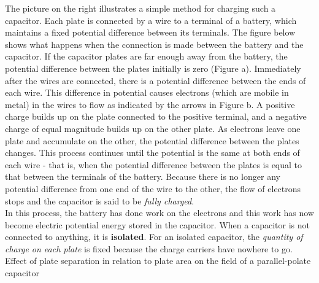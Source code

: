        The picture on the right illustrates a simple method for charging such a capacitor. Each plate is connected by a wire to a terminal of a battery, which maintains a fixed potential difference between its terminals.
        The figure below shows what happens when the connection is made between the battery and the capacitor. If the capacitor plates are far enough away from the battery, the potential difference between the plates
        initially is zero (Figure a). Immediately after the wires are connected, there is a potential difference between the ends of each wire. This difference in potential causes electrons (which are mobile in metal) in
        the wires to flow as indicated by the arrows in Figure b. A positive charge builds up on the plate connected to the positive terminal, and a negative charge of equal magnitude builds up on the other plate. As
        electrons leave one plate and accumulate on the other, the potential difference between the plates changes. This process continues until the potential is the same at both ends of each wire - that is, when the
        potential difference between the plates is equal to that between the terminals of the battery. Because there is no longer any potential difference from one end of the wire to the other, the flow of electrons
        stops and the capacitor is said to be \textit{fully charged}. \\

        In this process, the battery has done work on the electrons and this work has now become electric potential energy stored in the capacitor. When a capacitor is not connected to anything, it is \textbf{isolated}.
        For an isolated capacitor, the \textit{quantity of charge on each plate} is fixed because the charge carriers have nowhere to go. \\

        Effect of plate separation in relation to plate area on the field of a parallel-polate capacitor

